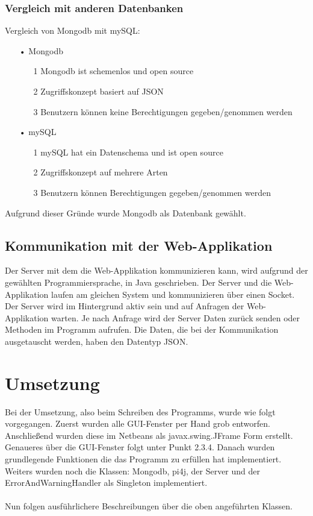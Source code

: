 \subsubsection{Vergleich mit anderen Datenbanken}
Vergleich von Mongodb mit mySQL:
\begin{itemize}
\item[•] Mongodb
\begin{itemize}
\item[1] Mongodb ist schemenlos und open source
\item[2] Zugriffskonzept basiert auf JSON
\item[3] Benutzern können keine Berechtigungen gegeben/genommen werden
\end{itemize}
\item[•] mySQL
\begin{itemize}
\item[1] mySQL hat ein Datenschema und ist open source
\item[2] Zugriffskonzept auf mehrere Arten
\item[3] Benutzern können Berechtigungen gegeben/genommen werden
\end{itemize}
\end{itemize}

Aufgrund dieser Gründe wurde Mongodb als Datenbank gewählt.

\subsection{Kommunikation mit der Web-Applikation}
Der Server mit dem die Web-Applikation kommunizieren kann, wird aufgrund der gewählten Programmiersprache, in Java geschrieben. Der Server und die Web-Applikation laufen am gleichen System und kommunizieren über einen Socket. Der Server wird im Hintergrund aktiv sein und auf Anfragen der Web-Applikation warten. Je nach Anfrage wird der Server Daten zurück senden oder Methoden im Programm aufrufen. Die Daten, die bei der Kommunikation ausgetauscht werden, haben den Datentyp JSON.

\newpage

\section{Umsetzung}
Bei der Umsetzung, also beim Schreiben des Programms, wurde wie folgt vorgegangen. Zuerst wurden alle GUI-Fenster per Hand grob entworfen. Anschließend wurden diese im Netbeans als javax.swing.JFrame Form erstellt. Genaueres über die GUI-Fenster folgt unter Punkt 2.3.4. Danach wurden grundlegende Funktionen die das Programm zu erfüllen hat implementiert. Weiters wurden noch die Klassen: Mongodb, pi4j, der Server und der ErrorAndWarningHandler als Singleton implementiert. 
\\ \\ 
Nun folgen ausführlichere Beschreibungen über die oben angeführten Klassen.

